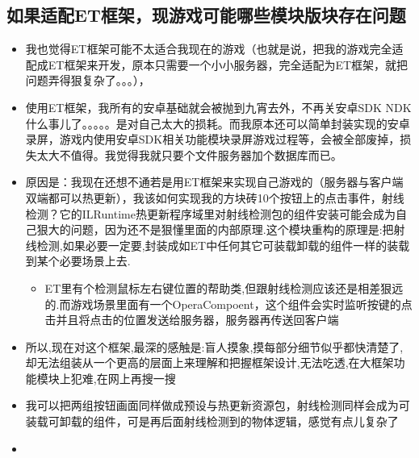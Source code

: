\documentclass[9pt, b5paper]{article}
\begin{document}
\subsection{如果适配ET框架，现游戏可能哪些模块版块存在问题}
\label{sec-2-1}
\begin{itemize}
\item 我也觉得ET框架可能不太适合我现在的游戏（也就是说，把我的游戏完全适配成ET框架来开发，原本只需要一个小小服务器，完全适配为ET框架，就把问题弄得狠复杂了。。。），
\item 使用ET框架，我所有的安卓基础就会被抛到九宵去外，不再关安卓SDK  NDK什么事儿了。。。。。是对自己太大的损耗。而我原本还可以简单封装实现的安卓录屏，游戏内使用安卓SDK相关功能模块录屏游戏过程等，会被全部废掉，损失太大不值得。我觉得我就只要个文件服务器加个数据库而已。
\item 原因是：我现在还想不通若是用ET框架来实现自己游戏的（服务器与客户端双端都可以热更新），我该如何实现我的方块砖10个按钮上的点击事件，射线检测？它的ILRuntime热更新程序域里对射线检测包的组件安装可能会成为自己狠大的问题，因为还不是狠懂里面的内部原理.这个模块重构的原理是:把射线检测,如果必要一定要,封装成如ET中任何其它可装载卸载的组件一样的装载到某个必要场景上去.
\begin{itemize}
\item ET里有个检测鼠标左右键位置的帮助类,但跟射线检测应该还是相差狠远的.而游戏场景里面有一个OperaCompoent，这个组件会实时监听按键的点击并且将点击的位置发送给服务器，服务器再传送回客户端
\end{itemize}
\item 所以,现在对这个框架,最深的感触是:盲人摸象,摸每部分细节似乎都快清楚了,却无法组装从一个更高的层面上来理解和把握框架设计,无法吃透,在大框架功能模块上犯难,在网上再搜一搜
\item 我可以把两组按钮画面同样做成预设与热更新资源包，射线检测同样会成为可装载可卸载的组件，可是再后面射线检测到的物体逻辑，感觉有点儿复杂了
\item 
\end{itemize}
\end{document}
